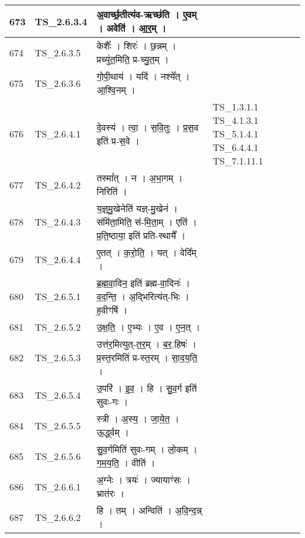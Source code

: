 \documentclass[17pt]{extarticle}
\begin{document}
\begin{longtable}{||p{0.4in}||p{0.9in}||p{4.0in}||p{0.9in}||}
        \hline
            673 & TS\_2.6.3.4 & अ॒वार्च्छ॒तीत्य॑व{-}ऋच्छ॑ति   ।   ए॒वम्   ।   अवेति॑   ।   आ॒र॒म्   ।    &      \\
        \hline
            674 & TS\_2.6.3.5 & केशैः᳚   ।   शिरः॑   ।   छ॒न्नम्   ।   प्रच्यु॑त॒मिति॒ प्र{-}च्यु॒त॒म्   ।    &      \\
        \hline
            675 & TS\_2.6.3.6 & गो॒पी॒थाय॑   ।   यदि॑   ।   नश्ये᳚त्   ।   आ॒श्वि॒नम्   ।    &      \\
        \hline
            676 & TS\_2.6.4.1 & दे॒वस्य॑   ।   त्वा॒   ।   स॒वि॒तुः   ।   प्र॒स॒व इति॑ प्र{-}स॒वे   ।    & TS\_1.3.1.1  TS\_4.1.3.1 TS\_5.1.4.1 TS\_6.4.4.1 TS\_7.1.11.1       \\
        \hline
            677 & TS\_2.6.4.2 & तस्मा᳚त्   ।   न   ।   अ॒भा॒गम्   ।   निरिति॑   ।    &      \\
        \hline
            678 & TS\_2.6.4.3 & य॒ज्ञ्॒मु॒खेनेति॑ यज्ञ्{-}मु॒खेन॑   ।   संमि॑ता॒मिति॒ सं{-}मि॒ता॒म्   ।   एति॑   ।   प्र॒ति॒ष्ठाया॒ इति॑ प्रति{-}स्थायै᳚   ।    &      \\
        \hline
            679 & TS\_2.6.4.4 & ए॒तत्   ।   क॒रो॒ति॒   ।   यत्   ।   वेदि᳚म्   ।    &      \\
        \hline
            680 & TS\_2.6.5.1 & ब्र॒ह्म॒वा॒दिन॒ इति॑ ब्रह्म{-}वा॒दिनः॑   ।   व॒द॒न्ति॒   ।   अ॒द्भिरित्य॑त्{-}भिः   ।   ह॒वीꣳषि॑   ।    &      \\
        \hline
            681 & TS\_2.6.5.2 & उ॒क्ष॒ति॒   ।   ए॒भ्यः   ।   ए॒व   ।   ए॒न॒त्   ।    &      \\
        \hline
            682 & TS\_2.6.5.3 & उत्त॑र॒मित्युत्{-}त॒र॒म्   ।   ब॒र॒.हिषः॑   ।   प्र॒स्त॒रमिति॑ प्र{-}स्त॒रम्   ।   सा॒द॒य॒ति॒   ।    &      \\
        \hline
            683 & TS\_2.6.5.4 & उ॒परि॑   ।   इ॒व॒   ।   हि   ।   सु॒व॒र्ग इति॑ सुवः{-}गः   ।    &      \\
        \hline
            684 & TS\_2.6.5.5 & स्त्री   ।   अ॒स्य॒   ।   जा॒ये॒त॒   ।   ऊ॒र्द्ध्वम्   ।    &      \\
        \hline
            685 & TS\_2.6.5.6 & सु॒व॒र्गमिति॑ सुवः{-}गम्   ।   लो॒कम्   ।   ग॒म॒य॒ति॒   ।   वीति॑   ।    &      \\
        \hline
            686 & TS\_2.6.6.1 & अ॒ग्नेः   ।   त्रयः॑   ।   ज्यायाꣳ॑सः   ।   भ्रात॑रः   ।    &      \\
        \hline
            687 & TS\_2.6.6.2 & हि   ।   तम्   ।   अन्विति॑   ।   अ॒वि॒न्द॒न्न्   ।    &      \\

\end{longtable}
\end{document}

